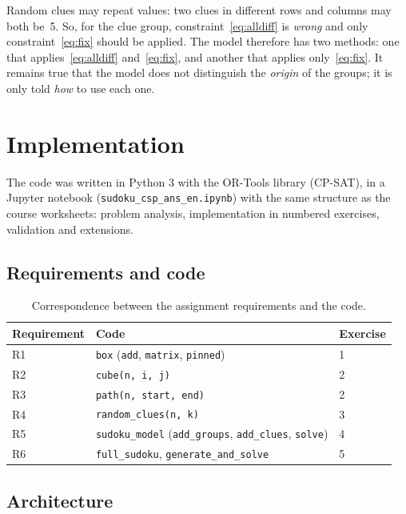 \documentclass[11pt,a4paper]{article}
\begin{document}
Random clues may repeat values: two clues in different rows and columns may both be~5. So, for the clue group, constraint~\eqref{eq:alldiff} is \emph{wrong} and only constraint~\eqref{eq:fix} should be applied. The model therefore has two methods: one that applies~\eqref{eq:alldiff} and~\eqref{eq:fix}, and another that applies only~\eqref{eq:fix}. It remains true that the model does not distinguish the \emph{origin} of the groups; it is only told \emph{how} to use each one.

\section{Implementation}\label{sec:impl}

The code was written in Python 3 with the OR-Tools library (CP-SAT), in a Jupyter notebook (\texttt{sudoku\_csp\_ans\_en.ipynb}) with the same structure as the course worksheets: problem analysis, implementation in numbered exercises, validation and extensions.

\subsection{Requirements and code}

\begin{table}[h]
\centering
\begin{tabular}{lll}
\toprule
Requirement & Code & Exercise \\
\midrule
R1 & \texttt{box} (\texttt{add}, \texttt{matrix}, \texttt{pinned}) & 1 \\
R2 & \texttt{cube(n, i, j)} & 2 \\
R3 & \texttt{path(n, start, end)} & 2 \\
R4 & \texttt{random\_clues(n, k)} & 3 \\
R5 & \texttt{sudoku\_model} (\texttt{add\_groups}, \texttt{add\_clues}, \texttt{solve}) & 4 \\
R6 & \texttt{full\_sudoku}, \texttt{generate\_and\_solve} & 5 \\
\bottomrule
\end{tabular}
\caption{Correspondence between the assignment requirements and the code.}
\end{table}

\subsection{Architecture}
\end{document}
